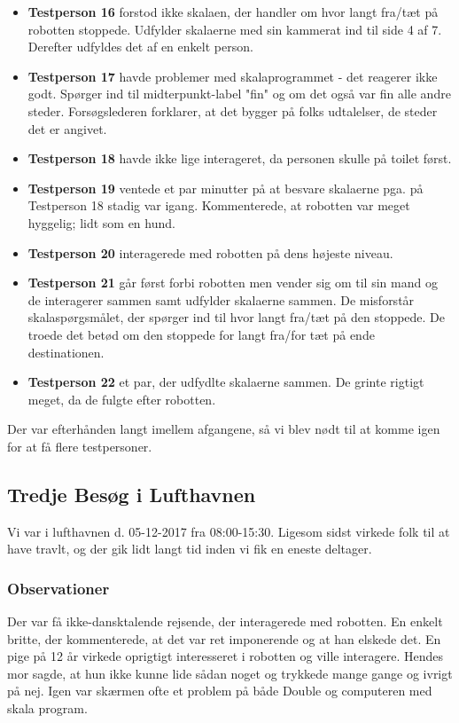 \begin{itemize}
\item \textbf{Testperson 16} forstod ikke skalaen, der handler om hvor langt fra/tæt på robotten stoppede. Udfylder skalaerne med sin kammerat ind til side 4 af 7. Derefter udfyldes det af en enkelt person.
\item \textbf{Testperson 17} havde problemer med skalaprogrammet - det reagerer ikke godt. Spørger ind til midterpunkt-label "fin" og om det også var fin alle andre steder. Forsøgslederen forklarer, at det bygger på folks udtalelser, de steder det er angivet.
\item \textbf{Testperson 18} havde ikke lige interageret, da personen skulle på toilet først.
\item 	\textbf{Testperson 19} ventede et par minutter på at besvare skalaerne pga. på Testperson 18 stadig var igang. Kommenterede, at robotten var meget hyggelig; lidt som en hund.
\item 	\textbf{Testperson 20} interagerede med robotten på dens højeste niveau.
\item \textbf{Testperson 21} går først forbi robotten men vender sig om til sin mand og de interagerer sammen samt udfylder skalaerne sammen. De misforstår skalaspørgsmålet, der spørger ind til hvor langt fra/tæt på den stoppede. De troede det betød om den stoppede for langt fra/for tæt på ende destinationen.
\item \textbf{Testperson 22} et par, der udfydlte skalaerne sammen. De grinte rigtigt meget, da de fulgte efter robotten.
\end{itemize}

Der var efterhånden langt imellem afgangene, så vi blev nødt til at komme igen for at få flere testpersoner.

\subsection{Tredje Besøg i Lufthavnen}
Vi var i lufthavnen d. 05-12-2017 fra 08:00-15:30. Ligesom sidst virkede folk til at have travlt, og der gik lidt langt tid inden vi fik en eneste deltager. 

\subsubsection{Observationer}
Der var få ikke-dansktalende rejsende, der interagerede med robotten. En enkelt britte, der kommenterede, at det var ret imponerende og at han elskede det. En pige på 12 år virkede oprigtigt interesseret i robotten og ville interagere. Hendes mor sagde, at hun ikke kunne lide sådan noget og trykkede mange gange og ivrigt på nej.
Igen var skærmen ofte et problem på både Double og computeren med skala program.

